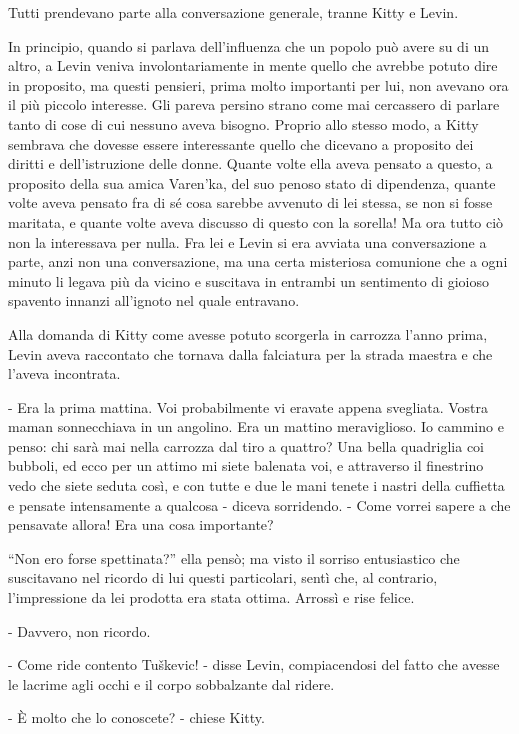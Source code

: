 Tutti prendevano parte alla conversazione generale, tranne Kitty e Levin. 

In principio, quando si parlava dell'influenza che un popolo può avere su di un altro, a Levin veniva involontariamente in mente quello che avrebbe potuto dire in proposito, ma questi pensieri, prima molto importanti per lui, non avevano ora il più piccolo interesse. Gli pareva persino strano come mai cercassero di parlare tanto di cose di cui nessuno aveva bisogno. Proprio allo stesso modo, a Kitty sembrava che dovesse essere interessante quello che dicevano a proposito dei diritti e dell'istruzione delle donne. Quante volte ella aveva pensato a questo, a proposito della sua amica Varen'ka, del suo penoso stato di dipendenza, quante volte aveva pensato fra di sé cosa sarebbe avvenuto di lei stessa, se non si fosse maritata, e quante volte aveva discusso di questo con la sorella! Ma ora tutto ciò non la interessava per nulla. Fra lei e Levin si era avviata una conversazione a parte, anzi non una conversazione, ma una certa misteriosa comunione che a ogni minuto li legava più da vicino e suscitava in entrambi un sentimento di gioioso spavento innanzi all'ignoto nel quale entravano. 

Alla domanda di Kitty come avesse potuto scorgerla in carrozza l'anno prima, Levin aveva raccontato che tornava dalla falciatura per la strada maestra e che l'aveva incontrata. 

- Era la prima mattina. Voi probabilmente vi eravate appena svegliata. Vostra maman sonnecchiava in un angolino. Era un mattino meraviglioso. Io cammino e penso: chi sarà mai nella carrozza dal tiro a quattro? Una bella quadriglia coi bubboli, ed ecco per un attimo mi siete balenata voi, e attraverso il finestrino vedo che siete seduta così, e con tutte e due le mani tenete i nastri della cuffietta e pensate intensamente a qualcosa - diceva sorridendo. - Come vorrei sapere a che pensavate allora! Era una cosa importante? 

``Non ero forse spettinata?'' ella pensò; ma visto il sorriso entusiastico che suscitavano nel ricordo di lui questi particolari, sentì che, al contrario, l'impressione da lei prodotta era stata ottima. Arrossì e rise felice. 

- Davvero, non ricordo. 

- Come ride contento Tuškevic! - disse Levin, compiacendosi del fatto che avesse le lacrime agli occhi e il corpo sobbalzante dal ridere. 

- È molto che lo conoscete? - chiese Kitty. 


